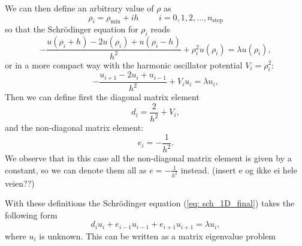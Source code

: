 \documentclass[11pt,a4wide]{article}
\begin{document}
We can then define an arbitrary value of $\rho$ as 
\[
    \rho_i= \rho_{\mathrm{min}} + ih \hspace{1cm} i=0,1,2,\dots , n_{\mathrm{step}}
\]
so that the Schr\"odinger equation for $\rho_i$ reads
\[
-\frac{u(\rho_i+h) -2u(\rho_i) +u(\rho_i-h)}{h^2}+\rho_i^2u(\rho_i)  = \lambda u(\rho_i),
\]
or in a more compact way with the harmonic oscillator potential $V_i=\rho_i^2$:
\[
-\frac{u_{i+1} -2u_i +u_{i-1} }{h^2}+V_iu_i  = \lambda u_i,
\]
Then we can define first the diagonal matrix element
\[
   d_i=\frac{2}{h^2}+V_i,
\]
and the non-diagonal matrix element:
\[
   e_i=-\frac{1}{h^2}.
\]
We observe that in this case all the non-diagonal matrix element is given by a constant, so we can denote them all as $e=-\frac{1}{h^2}$ instead. (insert e og ikke ei hele veien??)

With these definitions the Schr\"odinger equation (\ref{eq: sch_1D_final}) takes the following form
\begin{equation}
d_iu_i+e_{i-1}u_{i-1}+e_{i+1}u_{i+1}  = \lambda u_i,
\label{eq: sch_1d_descrete}
\end{equation}
where $u_i$ is unknown. This can be written as a matrix eigenvalue problem
\end{document}
